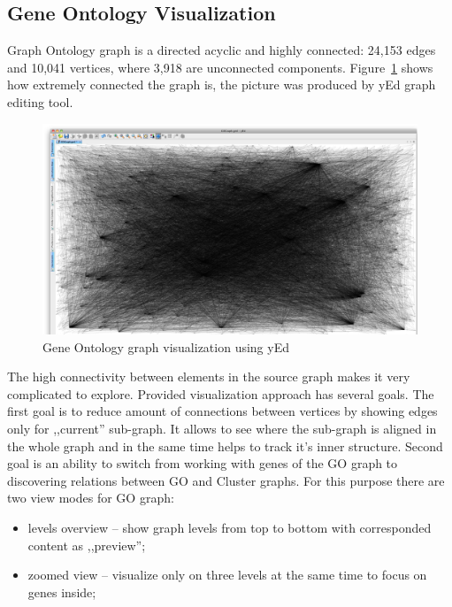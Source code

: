 \subsection{Gene Ontology Visualization}
\label{sec:go}

Graph Ontology graph is a directed acyclic and highly connected: 24,153 edges and 10,041 vertices, where 3,918 are unconnected components. Figure~\ref{fig:go_connections_yEd} shows how extremely connected the graph is, the picture was produced by yEd graph editing tool.

\begin{figure}
\centering
\includegraphics[scale=0.2]{pictures/yEd_GO_2.png}
\caption{Gene Ontology graph visualization using yEd}
\label{fig:go_connections_yEd}
\end{figure}

The high connectivity between elements in the source graph makes it very complicated to explore. Provided visualization approach has several goals. The first goal is to reduce amount of connections between vertices by showing edges only for ,,current'' sub-graph. It allows to see where the sub-graph is aligned in the whole graph and in the same time helps to track it's inner structure. Second goal is an ability to switch from working with genes of the GO graph to discovering relations between GO and Cluster graphs. For this purpose there are two view modes for GO graph:

\begin{itemize}
   \item levels overview -- show graph levels from top to bottom with corresponded content as ,,preview'';
   \item zoomed view -- visualize only on three levels at the same time to focus on genes inside;
\end{itemize}

